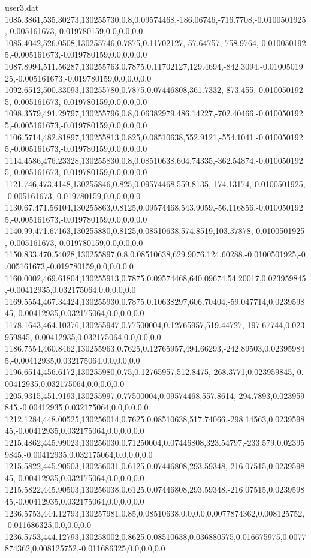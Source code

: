 \begin{filecontents}{user3.dat}
1085.3861,535.30273,130255730,0.8,0.09574468,-186.06746,-716.7708,-0.0100501925,-0.005161673,-0.019780159,0.0,0.0,0.0
1085.4042,526.0508,130255746,0.7875,0.11702127,-57.64757,-758.9764,-0.0100501925,-0.005161673,-0.019780159,0.0,0.0,0.0
1087.8994,511.56287,130255763,0.7875,0.11702127,129.4694,-842.3094,-0.0100501925,-0.005161673,-0.019780159,0.0,0.0,0.0
1092.6512,500.33093,130255780,0.7875,0.07446808,361.7332,-873.455,-0.0100501925,-0.005161673,-0.019780159,0.0,0.0,0.0
1098.3579,491.29797,130255796,0.8,0.06382979,486.14227,-702.40466,-0.0100501925,-0.005161673,-0.019780159,0.0,0.0,0.0
1106.5714,482.81897,130255813,0.825,0.08510638,552.9121,-554.1041,-0.0100501925,-0.005161673,-0.019780159,0.0,0.0,0.0
1114.4586,476.23328,130255830,0.8,0.08510638,604.74335,-362.54874,-0.0100501925,-0.005161673,-0.019780159,0.0,0.0,0.0
1121.746,473.4148,130255846,0.825,0.09574468,559.8135,-174.13174,-0.0100501925,-0.005161673,-0.019780159,0.0,0.0,0.0
1130.67,471.56104,130255863,0.8125,0.09574468,543.9059,-56.116856,-0.0100501925,-0.005161673,-0.019780159,0.0,0.0,0.0
1140.99,471.67163,130255880,0.8125,0.08510638,574.8519,103.37878,-0.0100501925,-0.005161673,-0.019780159,0.0,0.0,0.0
1150.833,470.54028,130255897,0.8,0.08510638,629.9076,124.60288,-0.0100501925,-0.005161673,-0.019780159,0.0,0.0,0.0
1160.0002,469.61804,130255913,0.7875,0.09574468,640.09674,54.20017,0.023959845,-0.00412935,0.032175064,0.0,0.0,0.0
1169.5554,467.34424,130255930,0.7875,0.10638297,606.70404,-59.047714,0.023959845,-0.00412935,0.032175064,0.0,0.0,0.0
1178.1643,464.10376,130255947,0.77500004,0.12765957,519.44727,-197.67744,0.023959845,-0.00412935,0.032175064,0.0,0.0,0.0
1186.7554,460.8462,130255963,0.7625,0.12765957,494.66293,-242.89503,0.023959845,-0.00412935,0.032175064,0.0,0.0,0.0
1196.6514,456.6172,130255980,0.75,0.12765957,512.8475,-268.3771,0.023959845,-0.00412935,0.032175064,0.0,0.0,0.0
1205.9315,451.9193,130255997,0.77500004,0.09574468,557.8614,-294.7893,0.023959845,-0.00412935,0.032175064,0.0,0.0,0.0
1212.1284,448.00525,130256014,0.7625,0.08510638,517.74066,-298.14563,0.023959845,-0.00412935,0.032175064,0.0,0.0,0.0
1215.4862,445.99023,130256030,0.71250004,0.07446808,323.54797,-233.579,0.023959845,-0.00412935,0.032175064,0.0,0.0,0.0
1215.5822,445.90503,130256031,0.6125,0.07446808,293.59348,-216.07515,0.023959845,-0.00412935,0.032175064,0.0,0.0,0.0
1215.5822,445.90503,130256038,0.6125,0.07446808,293.59348,-216.07515,0.023959845,-0.00412935,0.032175064,0.0,0.0,0.0
1236.5753,444.12793,130257981,0.85,0.08510638,0.0,0.0,0.0077874362,0.008125752,-0.011686325,0.0,0.0,0.0
1236.5753,444.12793,130258002,0.8625,0.08510638,0.036880575,0.016675975,0.0077874362,0.008125752,-0.011686325,0.0,0.0,0.0

\end{filecontents}
